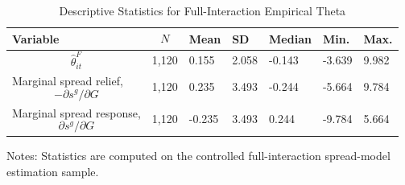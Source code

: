 \begin{table}[H]\centering
\begin{threeparttable}
\caption{Descriptive Statistics for Full-Interaction Empirical Theta}
\label{tab:theta_descriptive_stats}
\scriptsize
\begin{tabularx}{\textwidth}{lYYYYYY}
\toprule
Variable & $$N$$ & Mean & SD & Median & Min. & Max. \\
\midrule
$$\widehat{\theta}^{F}_{it}$$ & 1,120 & 0.155 & 2.058 & -0.143 & -3.639 & 9.982 \\
Marginal spread relief, $$-\partial s^g/\partial G$$ & 1,120 & 0.235 & 3.493 & -0.244 & -5.664 & 9.784 \\
Marginal spread response, $$\partial s^g/\partial G$$ & 1,120 & -0.235 & 3.493 & 0.244 & -9.784 & 5.664 \\
\bottomrule
\end{tabularx}
\begin{tablenotes}[flushleft]\footnotesize
\item Notes: Statistics are computed on the controlled full-interaction spread-model estimation sample.
\end{tablenotes}
\end{threeparttable}
\end{table}
